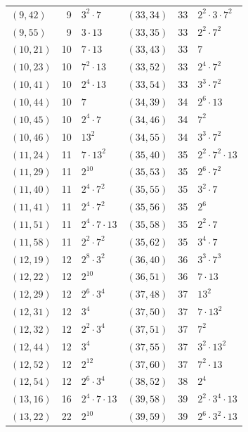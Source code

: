 \documentclass[11pt]{article}
\begin{document}
\begin{longtable}{@{}lrl@{\qquad}lrl@{}}
$(9,42)$ & 9 & $3^{2}\cdot 7$ & $(33,34)$ & 33 & $2^{2}\cdot 3\cdot 7^{2}$\\
$(9,55)$ & 9 & $3\cdot 13$ & $(33,35)$ & 33 & $2^{2}\cdot 7^{2}$\\
$(10,21)$ & 10 & $7\cdot 13$ & $(33,43)$ & 33 & $7$\\
$(10,23)$ & 10 & $7^{2}\cdot 13$ & $(33,52)$ & 33 & $2^{4}\cdot 7^{2}$\\
$(10,41)$ & 10 & $2^{4}\cdot 13$ & $(33,54)$ & 33 & $3^{3}\cdot 7^{2}$\\
$(10,44)$ & 10 & $7$ & $(34,39)$ & 34 & $2^{6}\cdot 13$\\
$(10,45)$ & 10 & $2^{4}\cdot 7$ & $(34,46)$ & 34 & $7^{2}$\\
$(10,46)$ & 10 & $13^{2}$ & $(34,55)$ & 34 & $3^{3}\cdot 7^{2}$\\
$(11,24)$ & 11 & $7\cdot 13^{2}$ & $(35,40)$ & 35 & $2^{2}\cdot 7^{2}\cdot 13$\\
$(11,29)$ & 11 & $2^{10}$ & $(35,53)$ & 35 & $2^{6}\cdot 7^{2}$\\
$(11,40)$ & 11 & $2^{4}\cdot 7^{2}$ & $(35,55)$ & 35 & $3^{2}\cdot 7$\\
$(11,41)$ & 11 & $2^{4}\cdot 7^{2}$ & $(35,56)$ & 35 & $2^{6}$\\
$(11,51)$ & 11 & $2^{4}\cdot 7\cdot 13$ & $(35,58)$ & 35 & $2^{2}\cdot 7$\\
$(11,58)$ & 11 & $2^{2}\cdot 7^{2}$ & $(35,62)$ & 35 & $3^{4}\cdot 7$\\
$(12,19)$ & 12 & $2^{8}\cdot 3^{2}$ & $(36,40)$ & 36 & $3^{3}\cdot 7^{3}$\\
$(12,22)$ & 12 & $2^{10}$ & $(36,51)$ & 36 & $7\cdot 13$\\
$(12,29)$ & 12 & $2^{6}\cdot 3^{4}$ & $(37,48)$ & 37 & $13^{2}$\\
$(12,31)$ & 12 & $3^{4}$ & $(37,50)$ & 37 & $7\cdot 13^{2}$\\
$(12,32)$ & 12 & $2^{2}\cdot 3^{4}$ & $(37,51)$ & 37 & $7^{2}$\\
$(12,44)$ & 12 & $3^{4}$ & $(37,55)$ & 37 & $3^{2}\cdot 13^{2}$\\
$(12,52)$ & 12 & $2^{12}$ & $(37,60)$ & 37 & $7^{2}\cdot 13$\\
$(12,54)$ & 12 & $2^{6}\cdot 3^{4}$ & $(38,52)$ & 38 & $2^{4}$\\
$(13,16)$ & 16 & $2^{4}\cdot 7\cdot 13$ & $(39,58)$ & 39 & $2^{2}\cdot 3^{4}\cdot 13$\\
$(13,22)$ & 22 & $2^{10}$ & $(39,59)$ & 39 & $2^{6}\cdot 3^{2}\cdot 13$\\

\end{longtable}
\end{document}
